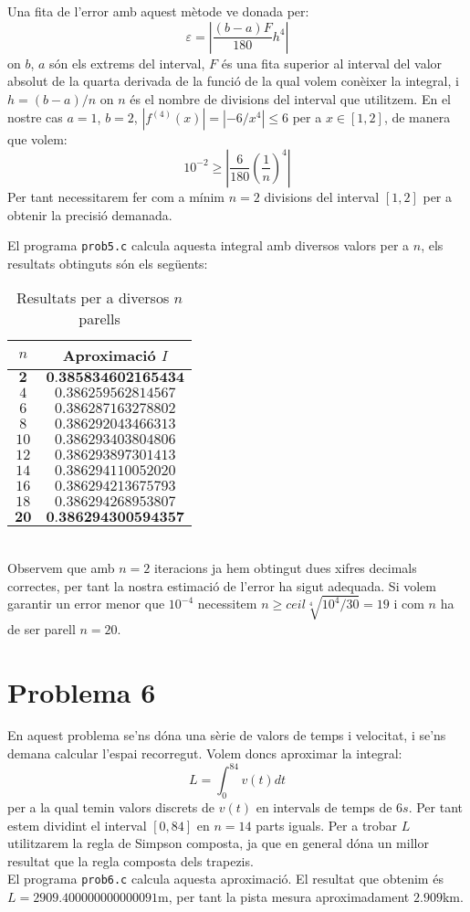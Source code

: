 \documentclass[12pt]{article}
\begin{document}
	Una fita de l'error amb aquest mètode ve donada per:
	$$\varepsilon=\left|\dfrac{(b-a)F}{180}h^4 \right| $$
	on $b$, $a$ són els extrems del interval, $F$ és una fita superior al interval del valor absolut de la quarta derivada de la funció de la qual volem conèixer la integral, i $h=(b-a)/n$ on $n$ és el nombre de divisions del interval que utilitzem. En el nostre cas $a=1$, $b=2$, $|f^{(4)}(x)|=|-6/x^4|\leq6$ per a $x\in[1,2]$, de manera que volem:
	$$10^{-2}\geq\left| \frac{6}{180}\left( \dfrac{1}{n}\right)^4 \right| $$
	Per tant necessitarem fer com a mínim $n=2$ divisions del interval $[1,2]$ per a obtenir la precisió demanada.
	
	El programa \texttt{prob5.c} calcula aquesta integral amb diversos valors per a $n$, els resultats obtinguts són els següents:
	\begin{table}[h!]
		\centering
		\caption{Resultats per a diversos $n$ parells}	
		\begin{tabular}{c|c}
			$n$ & Aproximació $I$\\
			\hline
			\hline
			$\textbf{2}$ & $\textbf{0.385834602165434}$  \\
			$4$ & $0.386259562814567$ \\
			$6$ & $0.386287163278802$ \\
			$8$ & $0.386292043466313$ \\
			$10$ & $0.386293403804806$ \\
			$12$ & $0.386293897301413$ \\
			$14$ & $0.386294110052020$ \\
			$16$ & $0.386294213675793$ \\
			$18$ & $0.386294268953807$ \\
			$\textbf{20}$ & $\textbf{0.386294300594357}$ \\
		\end{tabular}
	\end{table}\\
	Observem que amb $n=2$ iteracions ja hem obtingut dues xifres decimals correctes, per tant la nostra estimació de l'error ha sigut adequada. Si volem garantir un error menor que $10^{-4}$ necessitem $n\geqslant ceil\sqrt[4]{10^4/30}=19$ i com $n$ ha de ser parell $n=20$.
	
	\newpage
	\section*{Problema 6}
	En aquest problema se'ns dóna una sèrie de valors de temps i velocitat, i se'ns demana calcular l'espai recorregut. Volem doncs aproximar la integral:
	$$L=\int_{0}^{84}v(t)dt$$
	per a la qual temin valors discrets de $v(t)$ en intervals de temps de $6s$. Per tant estem dividint el interval $[0,84]$ en $n=14$ parts iguals. Per a trobar $L$ utilitzarem la regla de Simpson composta, ja que en general dóna un millor resultat que la regla composta dels trapezis. \\
	
	El programa \texttt{prob6.c} calcula aquesta aproximació. El resultat que obtenim és $L=2909.400000000000091$m, per tant la pista mesura aproximadament $2.909$km.
\end{document}
